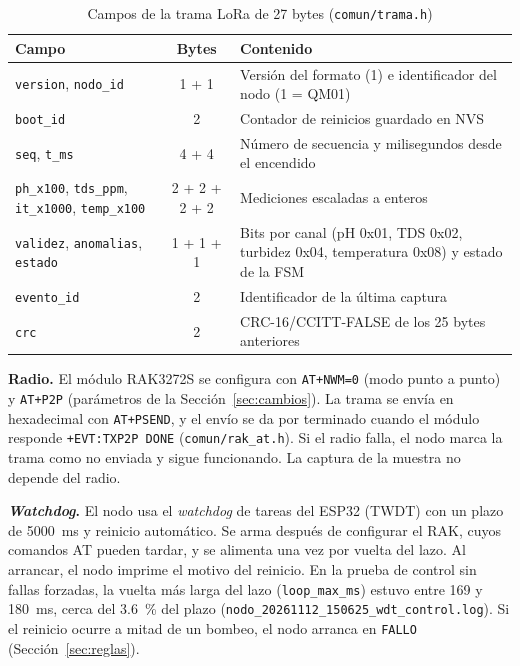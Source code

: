 \begin{table}[htbp]
\centering
\small
\caption{Campos de la trama LoRa de 27 bytes (\texttt{comun/trama.h})}
\label{tab:trama}
\begin{tabularx}{\textwidth}{l c Y}
\toprule
Campo & Bytes & Contenido \\
\midrule
\texttt{version}, \texttt{nodo\_id} & 1 + 1 & Versión del formato (1) e identificador del nodo (1 = QM01) \\
\texttt{boot\_id} & 2 & Contador de reinicios guardado en NVS \\
\texttt{seq}, \texttt{t\_ms} & 4 + 4 & Número de secuencia y milisegundos desde el encendido \\
\texttt{ph\_x100}, \texttt{tds\_ppm}, \texttt{it\_x1000}, \texttt{temp\_x100} & 2 + 2 + 2 + 2 & Mediciones escaladas a enteros \\
\texttt{validez}, \texttt{anomalias}, \texttt{estado} & 1 + 1 + 1 & Bits por canal (pH 0x01, TDS 0x02, turbidez 0x04, temperatura 0x08) y estado de la FSM \\
\texttt{evento\_id} & 2 & Identificador de la última captura \\
\texttt{crc} & 2 & CRC-16/CCITT-FALSE de los 25 bytes anteriores \\
\bottomrule
\end{tabularx}
\end{table}

\textbf{Radio.} El módulo RAK3272S se configura con \texttt{AT+NWM=0} (modo punto a punto) y \texttt{AT+P2P} (parámetros de la Sección~\ref{sec:cambios}). La trama se envía en hexadecimal con \texttt{AT+PSEND}, y el envío se da por terminado cuando el módulo responde \texttt{+EVT:TXP2P DONE} (\texttt{comun/rak\_at.h}). Si el radio falla, el nodo marca la trama como no enviada y sigue funcionando. La captura de la muestra no depende del radio.

\textbf{\textit{Watchdog}.} El nodo usa el \textit{watchdog} de tareas del ESP32 (TWDT) con un plazo de 5000~ms y reinicio automático. Se arma después de configurar el RAK, cuyos comandos AT pueden tardar, y se alimenta una vez por vuelta del lazo. Al arrancar, el nodo imprime el motivo del reinicio. En la prueba de control sin fallas forzadas, la vuelta más larga del lazo (\texttt{loop\_max\_ms}) estuvo entre 169 y 180~ms, cerca del 3.6~\% del plazo (\texttt{nodo\_20261112\_150625\_wdt\_control.log}). Si el reinicio ocurre a mitad de un bombeo, el nodo arranca en \texttt{FALLO} (Sección~\ref{sec:reglas}).

